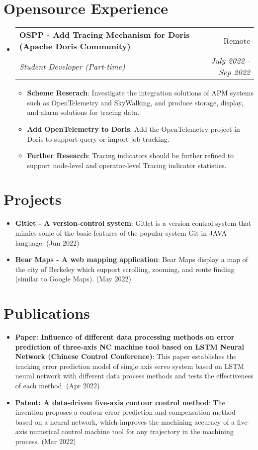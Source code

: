 \documentclass[a4paper,20pt]{article}
\makeatletter
\newcommand{\resumeItem}[2]{
  \item\small{
    \textbf{#1}{: #2 \vspace{-2pt}}
  }
}
\newcommand{\resumeSubheading}[4]{
  \vspace{-1pt}\item
    \begin{tabular*}{0.97\textwidth}{l@{\extracolsep{\fill}}r}
      \textbf{#1} & #2 \\
      \textit{#3} & \textit{#4} \\
    \end{tabular*}\vspace{-5pt}
}
\newcommand{\resumeSubItem}[2]{\resumeItem{#1}{#2}\vspace{-3pt}}
\newcommand{\resumeSubHeadingListStart}{\begin{itemize}[leftmargin=*]}
\newcommand{\resumeSubHeadingListEnd}{\end{itemize}}
\newcommand{\resumeItemListStart}{\begin{itemize}}
\newcommand{\resumeItemListEnd}{\end{itemize}\vspace{-5pt}}
\makeatother
\begin{document}
\section{Opensource Experience}
  \resumeSubHeadingListStart
    \resumeSubheading{OSPP - Add Tracing Mechanism for Doris (Apache Doris Community)}{Remote}
    {Student Developer (Part-time)}{July 2022 - Sep 2022}
    \resumeItemListStart
        \resumeItem{Scheme Reserach}
          {Investigate the integration solutions of APM systems such as OpenTelemetry and SkyWalking, and produce storage, display, and alarm solutions for tracing data.}
          \resumeItem{Add OpenTelemetry to Doris}
          {Add the OpenTelemetry project in Doris to support query or import job tracking.}
          \resumeItem{Further Research}
          {Tracing indicators should be further refined to support node-level and operator-level Tracing indicator statistics.}
      \resumeItemListEnd
\vspace{-5pt}

\resumeSubHeadingListEnd

\vspace{-5pt}
\section{Projects}
\resumeSubHeadingListStart
\resumeSubItem{Gitlet - A version-control system}
{Gitlet is a version-control system that mimics some of the basic features of the popular system Git in JAVA language. (Jun 2022)}
\vspace{2pt}
\resumeSubItem{Bear Maps - A web mapping application}
{Bear Maps display a map of the city of Berkeley which support scrolling, zooming, and route finding (similar to Google Maps). (May 2022)}
\vspace{2pt}
\resumeSubHeadingListEnd
\vspace{-5pt}
\section{Publications}
\resumeSubHeadingListStart
\resumeSubItem{Paper: Influence of different data processing methods on error prediction of three-axis NC machine tool based on LSTM Neural Network (Chinese Control Conference)}
{This paper establishes the tracking error prediction model of single axis servo system based on LSTM neural network with different data process methods and tests the effectiveness of each method. (Apr 2022)}
\vspace{2pt}
\resumeSubItem{Patent: A data-driven five-axis contour control method}
{The invention proposes a contour error prediction and compensation method based on a neural network, which improves the machining accuracy of a five-axis numerical control machine tool for any trajectory in the machining process. (Mar 2022)}
\resumeSubHeadingListEnd
\vspace{-5pt}
\end{document}
